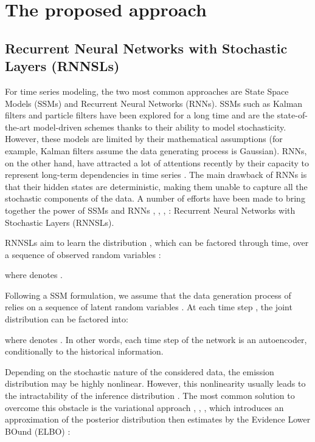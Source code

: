 \documentclass{article}
\begin{document}
  \section{The proposed approach}
\label{secArchitecture}

\subsection{Recurrent Neural Networks with Stochastic Layers (RNNSLs)}
\label{secRNNSLs}

For time series modeling, the two most common approaches are State Space Models (SSMs) and Recurrent Neural Networks (RNNs). SSMs such as Kalman filters \cite{brown_introduction_nodate} and particle filters \cite{doucet_tutorial_nodate} have been explored for a long time and are the state-of-the-art model-driven schemes thanks to their ability to model stochasticity. However, these models are limited  by their mathematical assumptions (for example, Kalman filters assume the data generating process is Gaussian). RNNs, on the other hand, have attracted a lot of attentions recently by their capacity to represent long-term dependencies in time series \cite{lecun_deep_2015}. The main drawback of RNNs is that their hidden states are deterministic, making them unable to capture all the stochastic components of the data.
A number of efforts have been made to bring together the power of SSMs and RNNs
\cite{bayer_learning_2014}, \cite{chung_recurrent_2015}, \cite{fraccaro_sequential_2016}, \cite{krishnan_deep_2017}: Recurrent Neural Networks with Stochastic Layers (RNNSLs). 


RNNSLs aim to learn the distribution , which can be factored through time, over a sequence of  observed random variables :

where  denotes .



Following a SSM formulation, we assume that the data generation process of  relies on a sequence of  latent random variables .
At each time step , the joint distribution  can be factored into:

where  denotes . In other words, each time step of the network is an autoencoder, conditionally to the historical information.

Depending on the stochastic nature of the considered data, the emission distribution  may be highly nonlinear. However, this nonlinearity usually leads to the intractability of the inference distribution . The most common solution to overcome this obstacle is the variational approach \cite{boulanger-lewandowski_modeling_2012}, \cite{chung_recurrent_2015}, \cite{fraccaro_sequential_2016}, which introduces an approximation  of the posterior distribution  then estimates   by the Evidence Lower BOund (ELBO) :
\vspace{-0.2cm}
\end{document}
